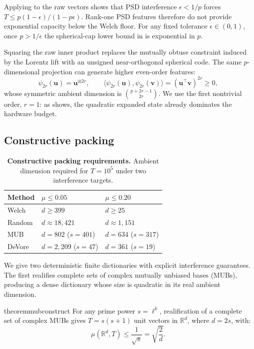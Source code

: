 \documentclass{article}
\newcommand{\1}{\bm{1}}
\newcommand{\lrangle}[1]{\langle#1\rangle}
\def\eps{{\epsilon}}
\def\vu{{\bm{u}}}
\def\vv{{\bm{v}}}
\newcommand{\R}{\mathbb{R}}
\theoremstyle{definition}
\begin{document}
Applying  to the raw vectors shows that PSD interference $\eps<1/p$ forces
$T\le p(1-\eps)/(1-p\eps)$. Rank-one PSD features therefore do not provide exponential capacity
below the Welch floor. For any fixed tolerance $\eps\in(0,1)$, once $p>1/\eps$ the spherical-cap
lower bound in  is exponential in $p$.

Squaring the raw inner product replaces the mutually obtuse constraint induced by the Lorentz lift
with an unsigned near-orthogonal spherical code. The same $p$-dimensional projection can generate
higher even-order features:
\[
  \psi_{2r}(\vu)=\vu^{\otimes 2r},
  \qquad
  \lrangle{\psi_{2r}(\vu),\psi_{2r}(\vv)}
    =(\vu^\top\vv)^{2r}\ge 0,
\]
whose symmetric ambient dimension is $\binom{p+2r-1}{2r}$. We use the first nontrivial order,
$r=1$: as  shows, the quadratic expanded state already dominates the hardware budget.

\subsection{Constructive packing} \label{ssec:constructive}
\begin{table}
  \centering
  \footnotesize
  \caption{\textbf{Constructive packing requirements.} Ambient dimension required for
  $T=10^5$ under two interference targets.}
  \label{tab:constructive-capacity}
  \begin{tabular}{@{}lll@{}}
    \toprule
    Method  & $\mu\le0.05$       & $\mu\le0.20$ \\
    \midrule
    Welch  & $d\ge399$          & $d\ge25$          \\
    Random & $d\approx18{,}421$ & $d\approx1{,}151$ \\
    MUB    & $d=802$ ($s=401$)  & $d=634$ ($s=317$) \\
    DeVore & $d=2{,}209$ ($s=47$) & $d=361$ ($s=19$) \\
    \bottomrule
  \end{tabular}
\end{table}

We give two deterministic finite dictionaries with explicit interference guarantees. The first realifies complete sets of complex mutually unbiased bases (MUBs), producing a dense dictionary whose size is quadratic in its real ambient dimension.

\begin{restatable}{theorem}{mubconstruct}
  \label{thm:mub}
  For any prime power $s=\ell^k$, realification of a complete set of complex MUBs gives
  $T=s(s+1)$ unit vectors in $\R^d$, where $d=2s$, with:
  \[
    \mu(\R^d,T)\le\frac{1}{\sqrt{s}}=\sqrt{\frac{2}{d}}.
  \]
\end{restatable}
\end{document}
